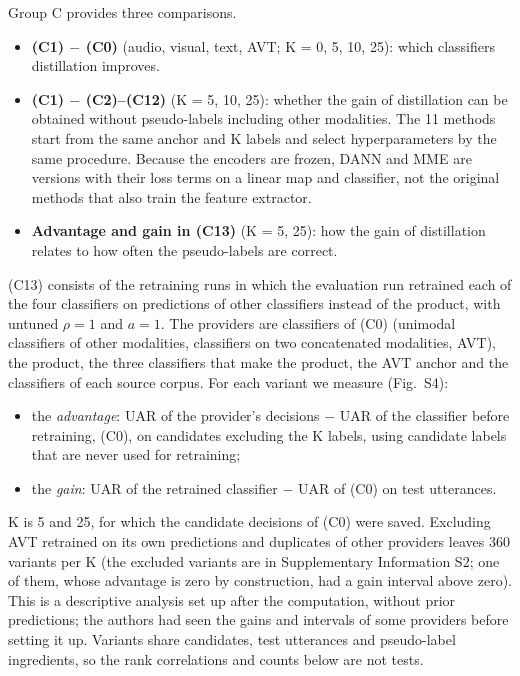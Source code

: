 Group C provides three comparisons.
\begin{itemize}
\item \textbf{(C1) $-$ (C0)} (audio, visual, text, AVT; K = 0, 5, 10, 25): which classifiers distillation improves.
\item \textbf{(C1) $-$ (C2)--(C12)} (K = 5, 10, 25): whether the gain of distillation can be obtained without pseudo-labels including other modalities. The 11 methods start from the same anchor and K labels and select hyperparameters by the same procedure. Because the encoders are frozen, DANN and MME are versions with their loss terms on a linear map and classifier, not the original methods that also train the feature extractor.
\item \textbf{Advantage and gain in (C13)} (K = 5, 25): how the gain of distillation relates to how often the pseudo-labels are correct.
\end{itemize}

(C13) consists of the retraining runs in which the evaluation run retrained each of the four classifiers on predictions of other classifiers instead of the product, with untuned $\rho=1$ and $a=1$. The providers are classifiers of (C0) (unimodal classifiers of other modalities, classifiers on two concatenated modalities, AVT), the product, the three classifiers that make the product, the AVT anchor and the classifiers of each source corpus. For each variant we measure (Fig.~S4):
\begin{itemize}
\item the \emph{advantage}: UAR of the provider's decisions $-$ UAR of the classifier before retraining, (C0), on candidates excluding the K labels, using candidate labels that are never used for retraining;
\item the \emph{gain}: UAR of the retrained classifier $-$ UAR of (C0) on test utterances.
\end{itemize}
K is 5 and 25, for which the candidate decisions of (C0) were saved. Excluding AVT retrained on its own predictions and duplicates of other providers leaves 360 variants per K (the excluded variants are in Supplementary Information S2; one of them, whose advantage is zero by construction, had a gain interval above zero). This is a descriptive analysis set up after the computation, without prior predictions; the authors had seen the gains and intervals of some providers before setting it up. Variants share candidates, test utterances and pseudo-label ingredients, so the rank correlations and counts below are not tests.

